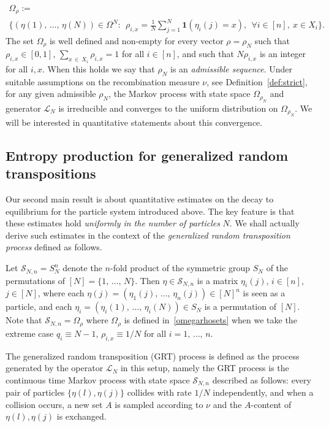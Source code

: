 \documentclass[10pt,a4paper]{amsart}
\newcommand{\Om}{\Omega}
\newcommand{\ind}{\mathbf{1}}
\newcommand{\cL}{\mathcal{L}}
\newcommand{\cS}{\mathcal{S}}
\let\r=\rho
\let\O=\Omega
\let\oldforall\forall
\renewcommand*{\forall}{\mathrel{\oldforall}}
\theoremstyle{definition}
\theoremstyle{plain}
\numberwithin{equation}{section}
\begin{document}
\begin{multline}\label{omegarhosets}
\Omega_{\rho} := \\
\Big\{(\eta(1),\,\dots,\,\eta(N)) \in \Om^N \!\!:\, \;
\textstyle{\rho_{i,x} = \frac{1}{N}\sum_{j=1}^N \ind(\eta_i(j) = x)},\;\, \forall i \in [n], \ x \in X_i\Big\}.
\end{multline}
The set $\Om_{\rho}$ is well defined and non-empty for every vector $\r=\r_N$ such that $\r_{i,x}\in[0,1]$, $\sum_{x\,\in\,X_i}\r_{i,x}=1$ for all $i\in[n]$, and such that $N\r_{i,x}$ is an integer for all $i,x$. When this holds we say that $\r_N$ is an \emph{admissible sequence}. Under suitable assumptions on the recombination measure $\nu$, see Definition~\ref{def:strict}, for any given admissible $\r_N$, the Markov process with state space $\O_{\r_N}$ and generator $\cL_N$ is irreducible and converges to the uniform distribution on $\O_{\r_N}$. We will be interested in quantitative statements about this convergence.

\setcounter{subsection}{4}
\subsection{Entropy production for generalized random transpositions}

Our second main result is about quantitative estimates on the decay to equilibrium for the particle system introduced above. The key feature is that these estimates hold \emph{uniformly in the number of particles} $N$. We shall actually derive such estimates in the context of the \emph{generalized random transposition process} defined as follows.

Let $\cS_{N,n}=S_N^n$ denote the $n$-fold product of the symmetric group $S_N$ of the permutations of $[N]=\{1,\,\dots,\,N\}$. Then $\eta\in \cS_{N,n}$ is a matrix $\eta_i(j)$, $i\in[n]$, $j\in[N]$, where each $\eta(j)=(\eta_1(j),\,\dots,\,\eta_n(j))\in[N]^n$ is seen as a particle, and each $\eta_i=(\eta_i(1),\,\dots,\,\eta_i(N))\in S_N$ is a permutation of $[N]$. Note that $\cS_{N,n} = \O_{\r}$ where $\O_{\r}$ is defined in~\eqref{omegarhosets} when we take the extreme case $q_i\equiv N-1$, $\r_{i,x}\equiv 1/N$ for all $i=1,\,\dots,\,n$.

The generalized random transposition (GRT) process is defined as the process generated by the operator $\cL_N$ in this setup, namely the GRT process is the continuous time Markov process with state space $\cS_{N,n}$ described as follows: every pair of particles $\{\eta(l),\eta(j)\}$ collides with rate $1/N$ independently, and when a collision occurs, a new set $A$ is sampled according to $\nu$ and the $A$-content of $\eta(l),\eta(j)$ is exchanged.
\end{document}
